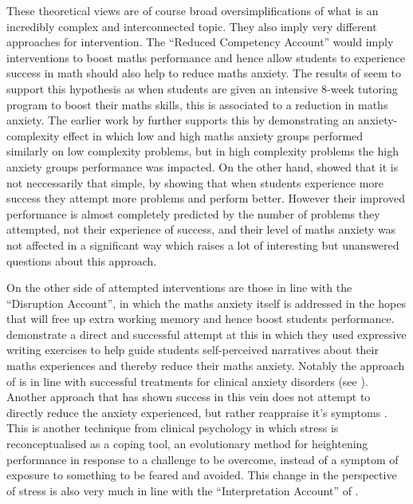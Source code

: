 \documentclass[twoside,12pt,a4paper]{report}
\begin{document}
These theoretical views are of course broad oversimplifications of what is an incredibly complex and interconnected topic. They also imply very different approaches for intervention. The ``Reduced Competency Account'' would imply interventions to boost maths performance and hence allow students to experience success in math should also help to reduce maths anxiety. The results of   seem to support this hypothesis as when students are given an intensive 8-week tutoring program to boost their maths skills, this is associated to a reduction in maths anxiety. The earlier work by  further supports this by demonstrating an anxiety-complexity effect in which low and high maths anxiety groups performed similarly on low complexity problems, but in high complexity problems the high anxiety groups performance was impacted. On the other hand,  showed that it is not neccessarily that simple, by showing that when students experience more success they attempt more problems and perform better. However their improved performance is almost completely predicted by the number of problems they attempted, not their experience of success, and their level of maths anxiety was not affected in a significant way which raises a lot of interesting but unanswered questions about this approach. 
	
On the other side of attempted interventions are those in line with the ``Disruption Account'', in which the maths anxiety itself is addressed in the hopes that will free up extra working memory and hence boost students performance.   demonstrate a direct and successful attempt at this in which they used expressive writing exercises to help guide students self-perceived narratives about their maths experiences and thereby reduce their maths anxiety. Notably the approach of  is in line with successful treatments for clinical anxiety disorders (see ). Another approach that has shown success in this vein does not attempt to directly reduce the anxiety experienced, but rather reappraise it's symptoms \cite{Jamieson2016}. This is another technique from clinical psychology in which stress is reconceptualised as a coping tool, an evolutionary method for heightening performance in response to a challenge to be overcome, instead of a symptom of exposure to something to be feared and avoided. This change in the perspective of stress is also very much in line with the ``Interpretation Account'' of .
\end{document}
